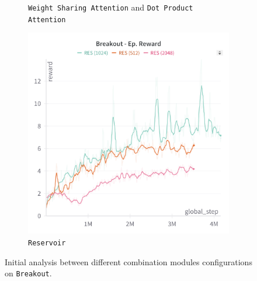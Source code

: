 \begin{figure}[ht]
\begin{subfigure}[b]{0.45\textwidth}
        \caption{\texttt{Weight Sharing Attention} and \texttt{Dot Product Attention}}
        \label{fig:breakout_wsa_dpa}
    \end{subfigure}
    \hfill
    \begin{subfigure}[b]{0.45\textwidth}
        \centering
        \includegraphics[width=\textwidth]{images/breakout_res.png}
        \caption{\texttt{Reservoir}}
        \label{fig:breakout_res}
    \end{subfigure}
    \caption{Initial analysis between different combination modules configurations on \texttt{Breakout}.}
    \label{fig:breakout_concat_modules}
\end{figure}